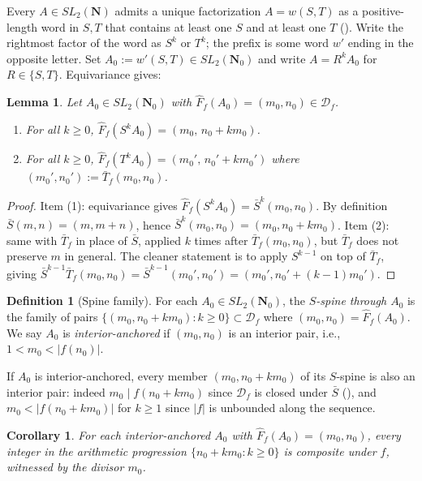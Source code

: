 \documentclass[11pt]{article}
\newtheorem{lemma}[theorem]{Lemma}
\newtheorem{corollary}[theorem]{Corollary}
\theoremstyle{definition}
\newtheorem{definition}[theorem]{Definition}
\newcommand{\N}{\mathbf{N}}
\newcommand{\Nz}{\mathbf{N}_0}
\newcommand{\SLNz}{SL_2(\Nz)}
\newcommand{\SLN}{SL_2(\N)}
\newcommand{\Df}{\mathcal{D}_f}
\newcommand{\Sb}{\bar{S}}
\newcommand{\Tb}{\bar{T}_f}
\newcommand{\Ff}{\hat{F}_f}
\begin{document}
Every $A \in \SLN$ admits a unique factorization $A = w(S,T)$ as a positive-length word in $S,T$ that contains at least one $S$ and at least one $T$ (\cite[Cor.~1.2]{shakov}). Write the rightmost factor of the word as $S^k$ or $T^k$; the prefix is some word $w'$ ending in the opposite letter. Set $A_0 := w'(S,T) \in \SLNz$ and write $A = R^k A_0$ for $R \in \{S,T\}$. Equivariance gives:

\begin{lemma}\label{lem:spine-action}
Let $A_0 \in \SLNz$ with $\Ff(A_0) = (m_0,n_0) \in \Df$.
\begin{enumerate}
\item For all $k \ge 0$, $\Ff(S^k A_0) = (m_0,\, n_0 + k m_0)$.
\item For all $k \ge 0$, $\Ff(T^k A_0) = (m_0',\, n_0' + k m_0')$ where $(m_0',n_0') := \Tb(m_0,n_0)$.
\end{enumerate}
\end{lemma}

\begin{proof}
Item (1): equivariance gives $\Ff(S^k A_0) = \Sb^k(m_0,n_0)$. By definition $\Sb(m,n) = (m,m+n)$, hence $\Sb^k(m_0,n_0) = (m_0, n_0+km_0)$. Item (2): same with $\Tb$ in place of $\Sb$, applied $k$ times after $\Tb(m_0,n_0)$, but $\Tb$ does not preserve $m$ in general. The cleaner statement is to apply $S^{k-1}$ on top of $\Tb$, giving $\Sb^{k-1}\Tb(m_0,n_0) = \Sb^{k-1}(m_0',n_0') = (m_0', n_0'+(k-1)m_0')$.
\end{proof}

\begin{definition}[Spine family]\label{def:spine-family}
For each $A_0 \in \SLNz$, the \emph{$S$-spine through $A_0$} is the family of pairs $\{(m_0, n_0+km_0) : k \ge 0\} \subset \Df$ where $(m_0,n_0) = \Ff(A_0)$. We say $A_0$ is \emph{interior-anchored} if $(m_0,n_0)$ is an interior pair, i.e., $1 < m_0 < |f(n_0)|$.
\end{definition}

If $A_0$ is interior-anchored, every member $(m_0, n_0+km_0)$ of its $S$-spine is also an interior pair: indeed $m_0 \mid f(n_0+km_0)$ since $\Df$ is closed under $\Sb$ (\cite[Prop.~2.10]{shakov}), and $m_0 < |f(n_0+km_0)|$ for $k \ge 1$ since $|f|$ is unbounded along the sequence.

\begin{corollary}\label{cor:spine-AP}
For each interior-anchored $A_0$ with $\Ff(A_0) = (m_0,n_0)$, every integer in the arithmetic progression $\{n_0+km_0 : k \ge 0\}$ is composite under $f$, witnessed by the divisor $m_0$.
\end{corollary}
\end{document}
